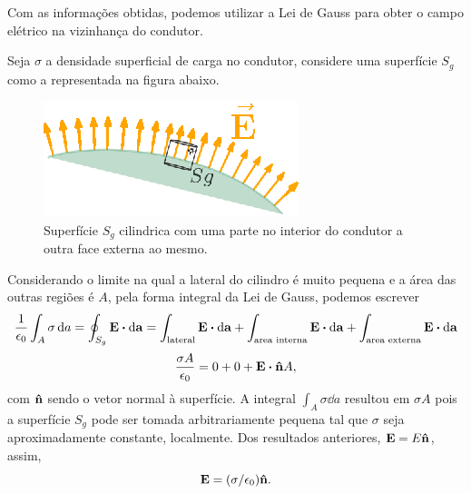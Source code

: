 Com as informações obtidas, podemos utilizar a Lei de Gauss para obter o campo elétrico na vizinhança do condutor.

Seja $\sigma$ a densidade superficial de carga no condutor, considere uma superfície $S_g$ como a representada na figura abaixo.

\begin{figure}[h]
  \center
  \includegraphics[scale = 1.1]{./imgs/gauss.eps}
  \caption{Superfície $S_g$ cilindrica com uma parte no interior do condutor a outra face externa ao mesmo.}
\end{figure}

Considerando o limite na qual a lateral do cilindro é muito pequena e a área das outras regiões é $A$, pela forma integral da Lei de Gauss, podemos escrever
\begin{align*}
  \frac{1}{\epsilon_0} \int_A \sigma \dd{a} = \oint_{S_g} \vb{E} \vdot \dd{\vb{a}} = \int_\text{lateral} \vb{E} \vdot \dd{\vb{a}} + \int_\text{area interna} \vb{E} \vdot \dd{\vb{a}} + \int_\text{area externa} \vb{E} \vdot \dd{\vb{a}}
\end{align*}
\begin{align*}
  \frac{\sigma A}{\epsilon_0} = 0 + 0 + \vb{E} \vdot \vu{n} A,
\end{align*}
com $\vu{n}$ sendo o vetor normal à superfície. A integral $\int_A \sigma \dd{a}$ resultou em $\sigma A$ pois a superfície $S_g$ pode ser tomada arbitrariamente pequena tal que $\sigma$ seja aproximadamente constante, localmente.
Dos resultados anteriores, $\vb{E} = E \vu{n}$, assim,
\begin{equation*}
  \vb{E} = (\sigma/\epsilon_0) \vu{n}.
\end{equation*}













